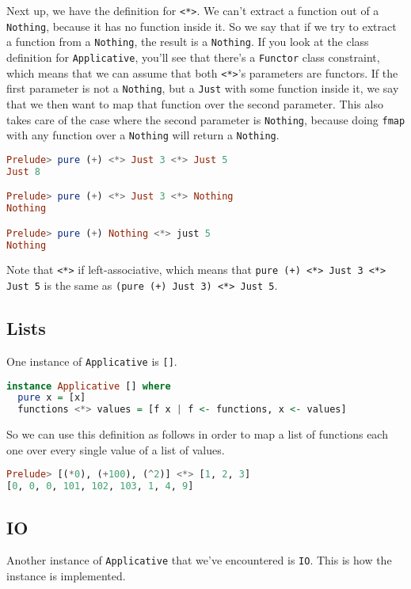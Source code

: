 Next up, we have the definition for \texttt{<*>}. We can't extract a function out of a \texttt{Nothing}, because it has no function inside it. So we say that if we try to extract a function from a \texttt{Nothing}, the result is a \texttt{Nothing}. If you look at the class definition for \texttt{Applicative}, you'll see that there's a \texttt{Functor} class constraint, which means that we can assume that both \texttt{<*>}'s parameters are functors. If the first parameter is not a \texttt{Nothing}, but a \texttt{Just} with some function inside it, we say that we then want to map that function over the second parameter. This also takes care of the case where the second parameter is \texttt{Nothing}, because doing \texttt{fmap} with any function over a \texttt{Nothing} will return a \texttt{Nothing}.

\begin{lstlisting}[language=haskell]
Prelude> pure (+) <*> Just 3 <*> Just 5
Just 8

Prelude> pure (+) <*> Just 3 <*> Nothing
Nothing

Prelude> pure (+) Nothing <*> just 5
Nothing
\end{lstlisting}

Note that \texttt{<*>} if left-associative, which means that \texttt{pure (+) <*> Just 3 <*> Just 5} is the same as \texttt{(pure (+) Just 3) <*> Just 5}.
\linebreak \linebreak

\subsection{Lists}
One instance of \texttt{Applicative} is \texttt{[]}.

\begin{lstlisting}[language=haskell]
instance Applicative [] where
  pure x = [x]
  functions <*> values = [f x | f <- functions, x <- values]
\end{lstlisting}

So we can use this definition as follows in order to map a list of functions each one over every single value of a list of values.

\begin{lstlisting}[language=haskell]
Prelude> [(*0), (+100), (^2)] <*> [1, 2, 3]
[0, 0, 0, 101, 102, 103, 1, 4, 9]
\end{lstlisting}

\subsection{IO}
Another instance of \texttt{Applicative} that we've encountered is \texttt{IO}. This is how the instance is implemented.

